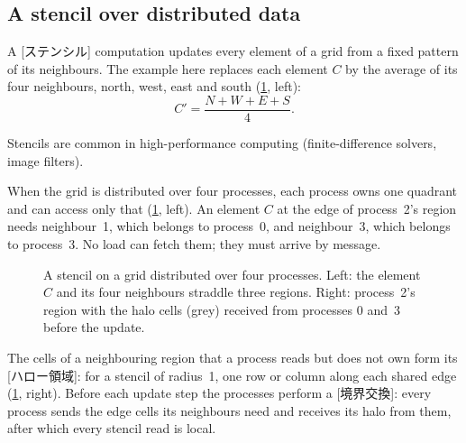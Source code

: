 \documentclass[../main.tex]{subfiles}
\begin{document}
\subsection{A stencil over distributed data}

\begin{definition}[Stencil]
  A [ステンシル] computation updates every element of a
  grid from a fixed pattern of its neighbours.  The example here replaces
  each element $C$ by the average of its four neighbours, north, west,
  east and south (\cref{fig:l02-stencil-halo}, left):
  \begin{equation}
    C' = \frac{N + W + E + S}{4}.
    \label{eq:l02-stencil}
  \end{equation}
\end{definition}

Stencils are common in high-performance computing (finite-difference
solvers, image filters).

When the grid is distributed over four processes, each process owns one
quadrant and can access only that (\cref{fig:l02-stencil-halo}, left).  An
element $C$ at the edge of process~2's region needs neighbour~1, which
belongs to process~0, and neighbour~3, which belongs to process~3.  No
load can fetch them; they must arrive by message.

\begin{figure}[tb]
  \centering
  
  \caption{A stencil on a grid distributed over four processes.  Left:
    the element $C$ and its four neighbours straddle three regions.
    Right: process~2's region with the halo cells (grey) received from
    processes 0 and~3 before the update.}
  \label{fig:l02-stencil-halo}
\end{figure}

\begin{definition}
  The cells of a neighbouring region that a process reads but does not
  own form its [ハロー領域]: for a stencil of
  radius~1, one row or column along each shared edge
  (\cref{fig:l02-stencil-halo}, right).  Before each update step the
  processes perform a [境界交換]: every process
  sends the edge cells its neighbours need and receives its halo from
  them, after which every stencil read is local.
\end{definition}
\end{document}
